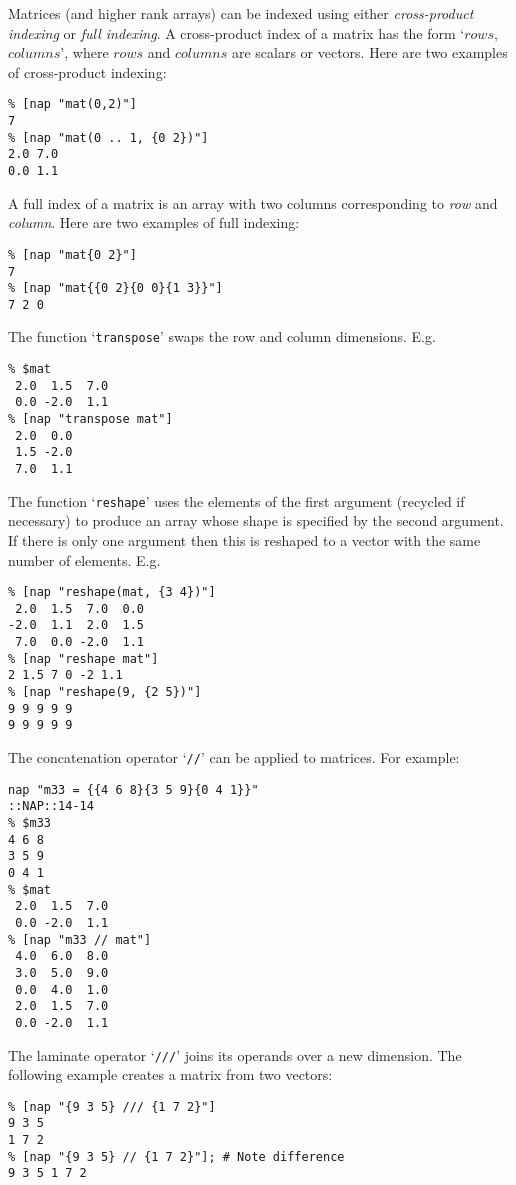   

Matrices (and higher rank arrays) can be indexed using either 
  \emph{cross-product indexing} or 
  \emph{full indexing}. A cross-product index of a matrix has the
  form `$rows$, $columns$', where 
  $rows$ and 
  $columns$ are scalars or vectors. Here are two examples of
  cross-product indexing:
  \begin{verbatim}
% [nap "mat(0,2)"]
7
% [nap "mat(0 .. 1, {0 2})"]
2.0 7.0
0.0 1.1
\end{verbatim}

  

A full index of a matrix is an array with two columns
  corresponding to 
  \emph{row} and 
  \emph{column}. Here are two examples of full indexing:
  \begin{verbatim}
% [nap "mat{0 2}"]
7
% [nap "mat{{0 2}{0 0}{1 3}}"]
7 2 0
\end{verbatim}

  

The function `\texttt{transpose}' swaps the row and column dimensions.
  E.g.
  \begin{verbatim}
% $mat
 2.0  1.5  7.0
 0.0 -2.0  1.1
% [nap "transpose mat"]
 2.0  0.0
 1.5 -2.0
 7.0  1.1
\end{verbatim}

  

The function `\texttt{reshape}' uses the elements of the first argument
  (recycled if necessary) to produce an array whose shape is specified
  by the second argument. If there is only one argument then this is
  reshaped to a vector with the same number of elements. E.g.
  \begin{verbatim}
% [nap "reshape(mat, {3 4})"]
 2.0  1.5  7.0  0.0
-2.0  1.1  2.0  1.5
 7.0  0.0 -2.0  1.1
% [nap "reshape mat"]
2 1.5 7 0 -2 1.1
% [nap "reshape(9, {2 5})"]
9 9 9 9 9
9 9 9 9 9
\end{verbatim}

  

The concatenation operator `\texttt{//}' can be applied to matrices. For example:
  \begin{verbatim}
nap "m33 = {{4 6 8}{3 5 9}{0 4 1}}"
::NAP::14-14
% $m33
4 6 8
3 5 9
0 4 1
% $mat
 2.0  1.5  7.0
 0.0 -2.0  1.1
% [nap "m33 // mat"]
 4.0  6.0  8.0
 3.0  5.0  9.0
 0.0  4.0  1.0
 2.0  1.5  7.0
 0.0 -2.0  1.1
\end{verbatim}

  

The laminate operator `\texttt{///}' joins its operands over a new dimension. The
  following example creates a matrix from two vectors:
  \begin{verbatim}
% [nap "{9 3 5} /// {1 7 2}"]
9 3 5
1 7 2
% [nap "{9 3 5} // {1 7 2}"]; # Note difference
9 3 5 1 7 2
\end{verbatim}

